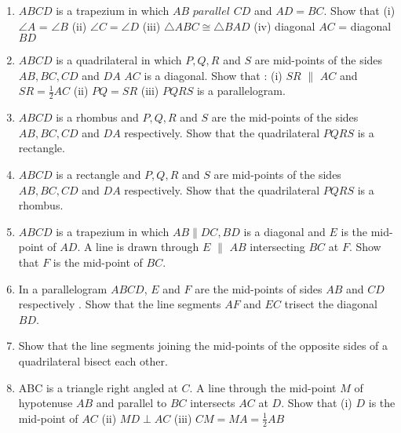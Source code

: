 \begin{enumerate}[label=\arabic*.,ref=\thesubsection.\theenumi]
(i) quadrilateral $ABED$ is a parallelogram (ii) quadrilateral $BEFC$ is a parallelogram (iii) $AD  parallel  CF$ and $AD = CF$ (iv) quadrilateral $ACFD$ is a parallelogram (v) $AC$ = $DF$ (vi)  $\triangle  ABC  \cong   \triangle  DEF$.
\item $ABCD$ is a trapezium in which $AB$  $parallel$  $CD$ and $AD = BC$. Show that (i)$\angle A$ =  $\angle B$  (ii)  $\angle C  =  \angle D$  (iii)  $\triangle  ABC  \cong   \triangle  BAD$ (iv) diagonal $AC$ = diagonal $BD$ 
\item $ABCD$ is a quadrilateral in which $P, Q, R$ and $S$ are mid-points of the sides $AB, BC, CD$ and $DA$ $AC$ is a diagonal. Show that :
(i) $SR$  $\parallel$  $AC$ and $SR =\frac{1}{ 2}AC$
(ii) $PQ = SR$ (iii)  $PQRS$  is a parallelogram.
\item $ABCD$ is a rhombus and  $P, Q, R$ and $S$  are the mid-points of the sides  $AB, BC, CD$ and $DA$ respectively. Show that the quadrilateral  $PQRS$  is a rectangle.
\item $ABCD$ is a rectangle and  $P, Q, R$ and $S$  are mid-points of the sides  $AB, BC, CD$ and $DA$ respectively. Show that the quadrilateral  $PQRS$  is a rhombus.
\item $ABCD$ is a trapezium in which $AB  \parallel  DC, BD$ is a diagonal and $E$ is the mid-point of $AD$. A line is drawn through $E$ $\parallel$  $AB$ intersecting $BC$ at $F$. Show that $F$ is the mid-point of $BC$.
\item In a parallelogram $ABCD$, $E$ and $F$ are the mid-points of sides $AB$ and $CD$ respectively . Show that the line segments $AF$ and $EC$ trisect the diagonal $BD$.
\item Show that the line segments joining the mid-points of the opposite sides of a quadrilateral bisect each other.
\item ABC is a triangle right angled at $C$. A line through the mid-point $M$ of hypotenuse $AB$ and parallel to $BC$ intersects $AC$ at $D$. Show that (i) $D$ is the mid-point of $AC$
(ii) $MD \perp AC$ (iii) $CM = MA = \frac{1}{2}AB$


\end{enumerate}
